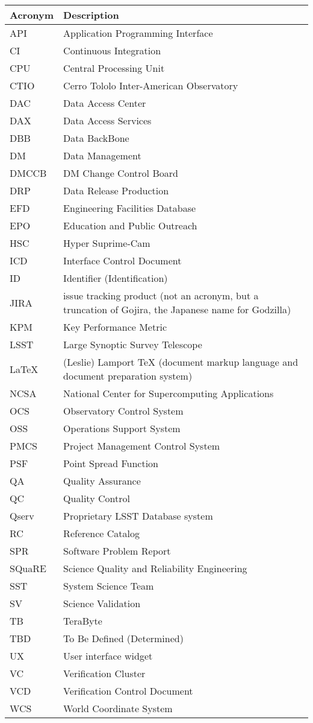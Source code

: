 \addtocounter{table}{-1}
\begin{longtable}{|l|p{}|}\hline
\textbf{Acronym} & \textbf{Description}  \\\hline
API&Application Programming Interface \\\hline
CI&Continuous Integration \\\hline
CPU&Central Processing Unit \\\hline
CTIO&Cerro Tololo Inter-American Observatory \\\hline
DAC&Data Access Center \\\hline
DAX&Data Access Services \\\hline
DBB&Data BackBone \\\hline
DM&Data Management \\\hline
DMCCB&DM Change Control Board \\\hline
DRP&Data Release Production \\\hline
EFD&Engineering Facilities Database \\\hline
EPO&Education and Public Outreach \\\hline
HSC&Hyper Suprime-Cam \\\hline
ICD&Interface Control Document \\\hline
ID&Identifier (Identification) \\\hline
JIRA&issue tracking product (not an acronym, but a truncation of Gojira, the Japanese name for Godzilla) \\\hline
KPM&Key Performance Metric \\\hline
LSST&Large Synoptic Survey Telescope \\\hline
LaTeX&(Leslie) Lamport TeX (document markup language and document preparation system) \\\hline
NCSA&National Center for Supercomputing Applications \\\hline
OCS&Observatory Control System \\\hline
OSS&Operations Support System \\\hline
PMCS&Project Management Control System \\\hline
PSF&Point Spread Function \\\hline
QA&Quality Assurance \\\hline
QC&Quality Control \\\hline
Qserv&Proprietary LSST Database system \\\hline
RC&Reference Catalog \\\hline
SPR&Software Problem Report \\\hline
SQuaRE&Science Quality and Reliability Engineering \\\hline
SST&System Science Team \\\hline
SV&Science Validation \\\hline
TB&TeraByte \\\hline
TBD&To Be Defined (Determined) \\\hline
UX&User interface widget \\\hline
VC&Verification Cluster \\\hline
VCD&Verification Control Document \\\hline
WCS&World Coordinate System \\\hline
\end{longtable}
